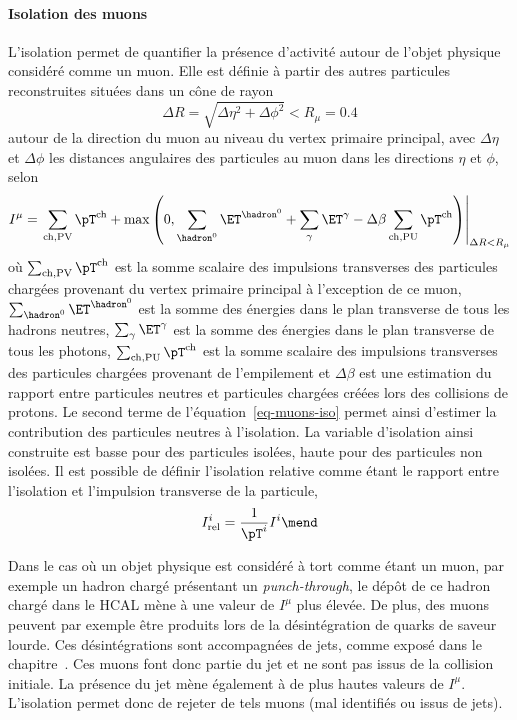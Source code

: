 \paragraph{Isolation des muons}
L'isolation permet de quantifier la présence d'activité autour de l'objet physique considéré comme un muon.
Elle est définie à partir des autres particules reconstruites situées dans un cône de rayon
\begin{equation}
\Delta R = \sqrt{\Delta\eta^2+\Delta\phi^2} < R_\mu=\num{0.4}
\end{equation}
autour de la direction du muon au niveau du vertex primaire principal,
avec $\Delta\eta$ et $\Delta\phi$ les distances angulaires des particules au muon dans les directions $\eta$ et $\phi$,
selon
\begin{equation}
I^{\mu}
=
\left.
\sum_{\text{ch},\text{PV}} \pT^{\text{ch}}
+
\max\left(
0
,
\sum_{\hadron^0}\ET^{\hadron^0}
+
\sum_{\gamma}\ET^{\gamma}
- \Delta\beta
\sum_{\text{ch},\text{PU}} \pT^{\text{ch}}
\right)
\right|_{\Delta R < R_\mu}
\label{eq-muons-iso}
\end{equation}
où
$\sum_{\text{ch},\text{PV}} \pT^{\text{ch}}$ est la somme scalaire des impulsions transverses des particules chargées provenant du vertex primaire principal à l'exception de ce muon,
$\sum_{\hadron^0}\ET^{\hadron^0}$ est la somme des énergies dans le plan transverse de tous les hadrons neutres,
$\sum_{\gamma}\ET^{\gamma}$ est la somme des énergies dans le plan transverse de tous les photons,
$\sum_{\text{ch},\text{PU}} \pT^{\text{ch}}$ est la somme scalaire des impulsions transverses des particules chargées provenant de l'empilement et
$\Delta\beta$ est une estimation du rapport entre particules neutres et particules chargées créées lors des collisions de protons.
Le second terme de l'équation~\eqref{eq-muons-iso} permet ainsi d'estimer la contribution des particules neutres à l'isolation.
La variable d'isolation ainsi construite est basse pour des particules isolées, haute pour des particules non isolées.
Il est possible de définir l'isolation relative comme étant le rapport entre l'isolation et l'impulsion transverse de la particule,
\begin{equation}
I_\text{rel}^{i}
=
\frac{1}{\pT^{i}}
I^{i}
\mend
\label{eq-muons-reliso}
\end{equation}
\par
Dans le cas où un objet physique est considéré à tort comme étant un muon, par exemple un hadron chargé présentant un \emph{punch-through}, le dépôt de ce hadron chargé dans le HCAL mène à une valeur de $I^{\mu}$ plus élevée.
De plus, des muons peuvent par exemple être produits lors de la désintégration de quarks de saveur lourde.
Ces désintégrations sont accompagnées de jets, comme exposé dans le chapitre~.
Ces muons font donc partie du jet et ne sont pas issus de la collision initiale.
La présence du jet mène également à de plus hautes valeurs de $I^{\mu}$.
L'isolation permet donc de rejeter de tels muons (mal identifiés ou issus de jets).
